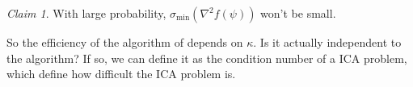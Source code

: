 \documentclass[english]{article} %
\providecommand{\claimname}{Claim}
\theoremstyle{plain}
\theoremstyle{remark}
\theoremstyle{claim}
\newtheorem{claim}[thm]{\protect\claimname}
\theoremstyle{plain}
\begin{document}
\begin{claim}
With large probability, $\sigma_{\min}(\nabla^2f(\psi))$ won't be small.
\end{claim}

So the efficiency of the algorithm of \citet{DHsu2012} depends on $\kappa$. Is it actually independent to the algorithm? If so, we can define it as the condition number of a ICA problem, which define how difficult the ICA problem is. 



\end{document}
